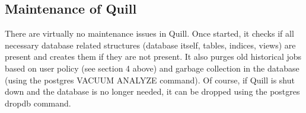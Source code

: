 \subsection{\label{sec:Quill-Maintenance}Maintenance of Quill}

There are virtually no maintenance issues in Quill.  Once started, it
checks if all necessary database related structures (database itself,
tables, indices, views) are present and creates them if they are
not present. It also purges old historical jobs based on user policy
(see section 4 above) and garbage collection in the database (using the
postgres VACUUM ANALYZE command).  Of course, if Quill is shut down and
the database is no longer needed, it can be dropped using the postgres
dropdb command.


